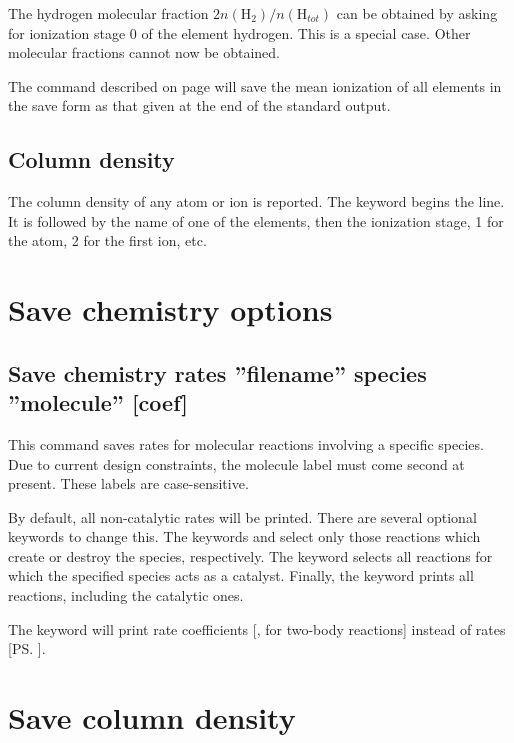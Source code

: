 The hydrogen molecular fraction $2n\left( {{\mathrm{H}}_2 } \right)/n\left(
{{\mathrm{H}}_{tot} } \right)$
can be obtained by asking for ionization stage 0 of the element hydrogen.
This is a special case.
Other molecular fractions cannot now be obtained.

The  command described on 
page \pageref{sec:CommandSaveIonizationMeans} will save
the mean ionization of all elements in the save form as that given
at the end of the standard output.

\subsection{Column density}

The column density of any atom or ion is reported.
The keyword
 begins the line.
It is followed by the name of one of the
elements, then the ionization stage, 1 for the atom,
2 for the first ion, etc.

\section{Save chemistry options}

\subsection{Save chemistry rates ''filename'' species ''molecule'' [coef]}
\label{s:savechemrate}

This command saves rates for molecular reactions involving a specific
species.  Due to current design constraints, the molecule label must come 
second at present.  These labels are case-sensitive.

By default, all non-catalytic rates will be printed.  
There are several optional keywords to change this.
The keywords  and 
select only those reactions which create or destroy the species, respectively.
The keyword  selects all reactions for which 
the specified species acts as a catalyst. 
Finally, the keyword  prints all reactions, including the catalytic ones.

The keyword  will print rate coefficients [\ccmps, for two-body reactions]
instead of rates [\ps].

\section{Save column density}

